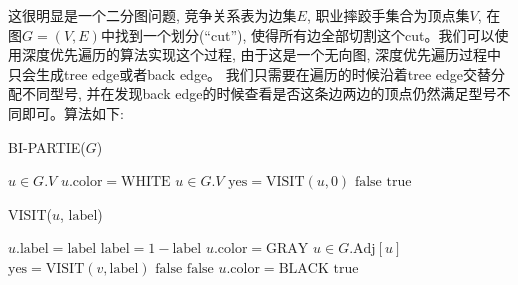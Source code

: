 \documentclass[paper=a4, fontsize=11pt]{scrartcl} %
\numberwithin{equation}{section} %
\numberwithin{figure}{section} %
\numberwithin{table}{section} %
\begin{document}
这很明显是一个二分图问题, 竞争关系表为边集$E$, 职业摔跤手集合为顶点集$V$, 在图$G=(V, E)$中找到一个划分(``cut''), 使得所有边全部切割这个cut。我们可以使用深度优先遍历的算法实现这个过程, 由于这是一个无向图, 深度优先遍历过程中只会生成tree edge或者back edge。 我们只需要在遍历的时候沿着tree edge交替分配不同型号, 并在发现back edge的时候查看是否这条边两边的顶点仍然满足型号不同即可。算法如下:
  \begin{algorithm}[H]
    \caption{BI-PARTIE($G$)}
    \label{algo:1}
    \begin{algorithmic}
       $u \in G.V$
      \State $u.\mbox{color} = \mbox{WHITE}$
      \EndFor
       $u \in G.V$
      \State $\mbox{yes} = \mbox{VISIT}(u, 0)$
      \State\Return $\mbox{false}$
      \EndIf
      \EndIf
      \EndFor
      \State\Return $\mbox{true}$
    \end{algorithmic}

  \end{algorithm}
    \begin{algorithm}[H]
    \caption{VISIT($u$, $\mbox{label}$)}
    \begin{algorithmic}
      \State $u.\mbox{label} = \mbox{label}$
      \State $\mbox{label} = 1 - \mbox{label}$
      \State $u.\mbox{color} = \mbox{GRAY}$
       $u \in G.\mbox{Adj}[u]$
      \State $\mbox{yes} = \mbox{VISIT}(v, \mbox{label})$
      \State\Return $\mbox{false}$
      \EndIf
      \Else{}
      \Return $\mbox{false}$
      \EndIf
      \EndIf
      \EndFor
      \State $u.\mbox{color} = \mbox{BLACK}$
      \State\Return $\mbox{true}$
    \end{algorithmic}
  \end{algorithm}
\end{document}
